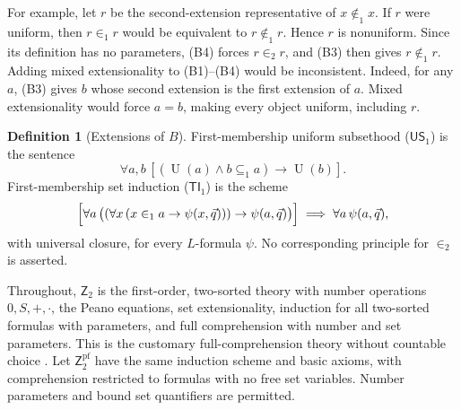 \documentclass[11pt,a4paper]{article}
\numberwithin{equation}{section}
\theoremstyle{definition}
\newtheorem{definition}[theorem]{Definition}
\theoremstyle{remark}
\newcommand{\Ztwo}{\mathsf{Z}_2}
\newcommand{\TI}{\mathsf{TI}_1}
\newcommand{\US}{\mathsf{US}_1}
\newcommand{\Unif}{\operatorname{U}}
\newcommand{\subone}{\subseteq_1}
\newcommand{\extone}{\in_1}
\newcommand{\exttwo}{\in_2}
\begin{document}
For example, let $r$ be the second-extension representative of $x\notin_1 x$. If $r$ were uniform, then $r\extone r$ would be equivalent to $r\notin_1 r$. Hence $r$ is nonuniform. Since its definition has no parameters, (B4) forces $r\exttwo r$, and (B3) then gives $r\notin_1 r$. Adding mixed extensionality to (B1)--(B4) would be inconsistent. Indeed, for any $a$, (B3) gives $b$ whose second extension is the first extension of $a$. Mixed extensionality would force $a=b$, making every object uniform, including $r$.

\begin{definition}[Extensions of $B$]\label{def:extensions}
First-membership uniform subsethood ($\US$) is the sentence
\[\forall a,b\,[(\Unif(a)\land b\subone a)\to\Unif(b)].\]
First-membership set induction ($\TI$) is the scheme
\[
\Bigl[\forall a\,\bigl((\forall x\,(x\extone a\to\psi(x,\vec q)))
  \to\psi(a,\vec q)\bigr)\Bigr]
 \;\Longrightarrow\;\forall a\,\psi(a,\vec q),
\]
with universal closure, for every $L$-formula $\psi$. No corresponding principle for $\exttwo$ is asserted.
\end{definition}
Throughout, $\Ztwo$ is the first-order, two-sorted theory with number operations $0,S,+,\cdot$, the Peano equations, set extensionality, induction for all two-sorted formulas with parameters, and full comprehension with number and set parameters. This is the customary full-comprehension theory without countable choice \cite{simpson}. Let $\Ztwo^{\mathrm{pf}}$ have the same induction scheme and basic axioms, with comprehension restricted to formulas with no free set variables. Number parameters and bound set quantifiers are permitted.
\end{document}
